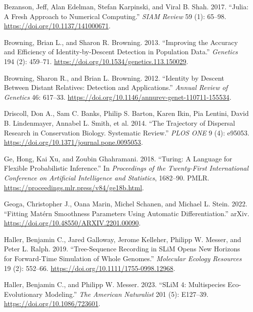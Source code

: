 \documentclass[
]{article}
\newlength{\cslhangindent}
\newenvironment{CSLReferences}[2] %
 {\begin{list}{}{%
  \setlength{\itemindent}{0pt}
  \setlength{\leftmargin}{0pt}
  \setlength{\parsep}{0pt}
  \ifodd #1
   \setlength{\leftmargin}{\cslhangindent}
   \setlength{\itemindent}{-1\cslhangindent}
  \fi
  \setlength{\itemsep}{#2\baselineskip}}}
 {\end{list}}
\begin{document}
\label{refs}
\begin{CSLReferences}{1}{0}
Bezanson, Jeff, Alan Edelman, Stefan Karpinski, and Viral B. Shah. 2017.
{``Julia: {A} {Fresh} {Approach} to {Numerical} {Computing}.''}
\emph{SIAM Review} 59 (1): 65--98.
\url{https://doi.org/10.1137/141000671}.

Browning, Brian L., and Sharon R. Browning. 2013. {``Improving the
Accuracy and Efficiency of Identity-by-Descent Detection in Population
Data.''} \emph{Genetics} 194 (2): 459--71.
\url{https://doi.org/10.1534/genetics.113.150029}.

Browning, Sharon R., and Brian L. Browning. 2012. {``Identity by Descent
Between Distant Relatives: Detection and Applications.''} \emph{Annual
Review of Genetics} 46: 617--33.
\url{https://doi.org/10.1146/annurev-genet-110711-155534}.

Driscoll, Don A., Sam C. Banks, Philip S. Barton, Karen Ikin, Pia
Lentini, David B. Lindenmayer, Annabel L. Smith, et al. 2014. {``The
{Trajectory} of {Dispersal} {Research} in {Conservation} {Biology}.
{Systematic} {Review}.''} \emph{PLOS ONE} 9 (4): e95053.
\url{https://doi.org/10.1371/journal.pone.0095053}.

Ge, Hong, Kai Xu, and Zoubin Ghahramani. 2018. {``Turing: {A} {Language}
for {Flexible} {Probabilistic} {Inference}.''} In \emph{Proceedings of
the {Twenty}-{First} {International} {Conference} on {Artificial}
{Intelligence} and {Statistics}}, 1682--90. PMLR.
\url{https://proceedings.mlr.press/v84/ge18b.html}.

Geoga, Christopher J., Oana Marin, Michel Schanen, and Michael L. Stein.
2022. {``Fitting {Matérn} {Smoothness} {Parameters} {Using} {Automatic}
{Differentiation}.''} arXiv.
\url{https://doi.org/10.48550/ARXIV.2201.00090}.

Haller, Benjamin C., Jared Galloway, Jerome Kelleher, Philipp W. Messer,
and Peter L. Ralph. 2019. {``Tree-Sequence Recording in {SLiM} Opens New
Horizons for Forward-Time Simulation of Whole Genomes.''}
\emph{Molecular Ecology Resources} 19 (2): 552--66.
\url{https://doi.org/10.1111/1755-0998.12968}.

Haller, Benjamin C., and Philipp W. Messer. 2023. {``{SLiM} 4:
{Multispecies} {Eco}-{Evolutionary} {Modeling}.''} \emph{The American
Naturalist} 201 (5): E127--39. \url{https://doi.org/10.1086/723601}.


\end{CSLReferences}
\end{document}
